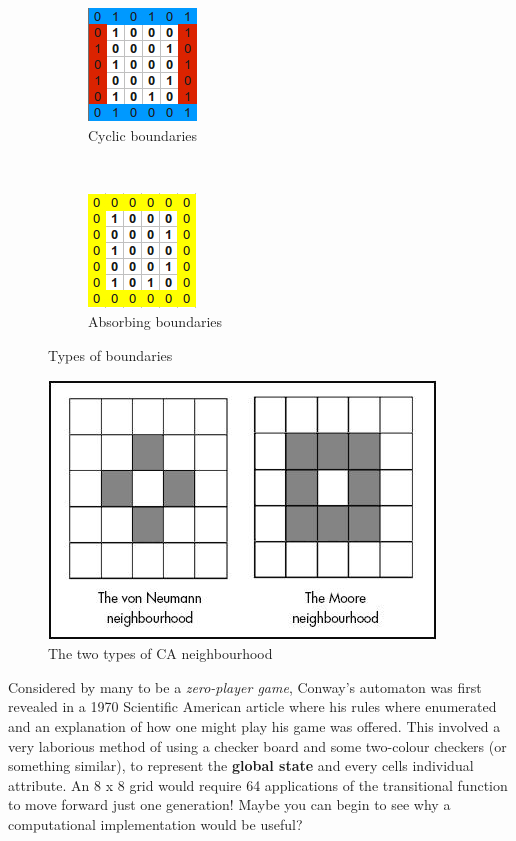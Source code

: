 \documentclass[11pt]{article} %
\begin{document}
\begin{figure}[h]
        \centering
        \begin{subfigure}[h]{0.3\textwidth}
                \centering
                \includegraphics[scale=1]{cyclic}
                \caption{Cyclic boundaries}
                \label{fig:cyclic}
        \end{subfigure}%
        ~ %
        \begin{subfigure}[h]{0.3\textwidth}
                \centering
                \includegraphics[scale=1]{absorbing}
                \caption{Absorbing boundaries}
                \label{fig:absorb}
        \end{subfigure}
        \caption{Types of boundaries}\label{fig:boundaries}
\end{figure}

\begin{figure}[h]
\centering
\includegraphics[scale=0.75]{neighbourhood}
\caption{The two types of CA neighbourhood}
\label{fig:neighbourhood}
\end{figure}
Considered by many to be a \emph{zero-player game}, Conway's automaton was first revealed in a 1970 Scientific American article \cite[Gardner]{ref7} where his rules where enumerated and an explanation of how one might play his game was offered. This involved a very laborious method of using a checker board and some two-colour checkers (or something similar), to represent the {\bf global state} and every cells individual attribute. An 8 x 8 grid would require 64 applications of the transitional function to move forward just one generation! Maybe you can begin to see why a computational implementation would be useful?
\end{document}
